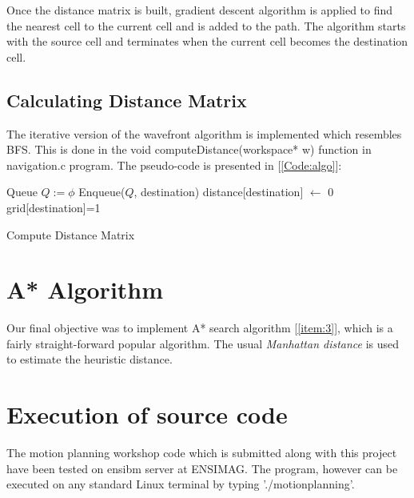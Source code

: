 \documentclass[12pt]{article}
\begin{document}
Once the distance matrix is built, gradient descent
  algorithm is applied to find the nearest cell to the current cell
  and is added to the path. The algorithm starts with the source cell and terminates when the current cell becomes the destination cell. 

\subsection{Calculating Distance Matrix}

 The iterative version of the wavefront algorithm is implemented
 which resembles BFS. This is done in the \textsf{void
   computeDistance(workspace* w)} function in \textsf{navigation.c}
 program. The pseudo-code is presented in [\autoref{Code:algo}]: \\


\linesnumbered
\begin{algorithm}[H]
 \SetVline
 Queue $Q:=\phi$\;
 Enqueue($Q$, destination)\;
 distance[destination] $\leftarrow$ $0$\;
 grid[destination]=1\;
 \caption{Compute Distance Matrix \label{Code:algo}}
\end{algorithm}



\section{A* Algorithm}
	Our final objective was to implement A* search algorithm
  [\ref{item:3}], which is a fairly straight-forward popular
  algorithm. The usual \textit{Manhattan distance} is used to estimate
  the heuristic distance.
	
\section{Execution of source code}

	The motion planning workshop code which is submitted along with this
  project have been tested on \textsf{ensibm} server at ENSIMAG. The
  program, however can be executed on any standard Linux terminal by
  typing \textsf{'./motionplanning'}. 
\end{document}
